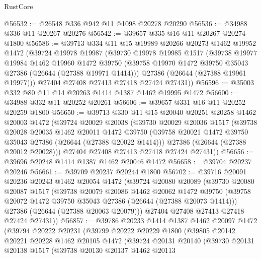 \begin{lexlean}{RustCore}
\begin{coremodule}
@56532 := @26548 @336 @942 @11 @1098 @20278 @20290
@56536 := @34988 @336 @11 @20267 @20276
@56542 := @39657 @335 @16 @11 @20267 @20274 @1800
@56586 := @39713
    @334
    @11
    @15
    @19989
    @20266
    @20273
    @1462
    @19952
    @1472
    (@39724
      @19978
      @19987
      (@39730
        @19978
        @19985
        @1517
        (@39738
          @19977
          @19984
          @1462
          @19960
          @1472
          @39750
          (@39758 @19970 @1472 @39750 @35043 @27386 (@26644 (@27388 @19971 @1414)))
          @27386
          (@26644 (@27388 @19961 @19977)))
        @27404
        @27408
        @27413
        @27418
        @27424
        @27431))
@56596 := @35003 @332 @80 @11 @14 @20263 @1414 @1387 @1462 @19995 @1472
@56600 := @34988 @332 @11 @20252 @20261
@56606 := @39657 @331 @16 @11 @20252 @20259 @1800
@56650 := @39713
    @330
    @11
    @15
    @20040
    @20251
    @20258
    @1462
    @20003
    @1472
    (@39724
      @20029
      @20038
      (@39730
        @20029
        @20036
        @1517
        (@39738
          @20028
          @20035
          @1462
          @20011
          @1472
          @39750
          (@39758 @20021 @1472 @39750 @35043 @27386 (@26644 (@27388 @20022 @1414)))
          @27386
          (@26644 (@27388 @20012 @20028)))
        @27404
        @27408
        @27413
        @27418
        @27424
        @27431))
@56656 := @39696 @20248 @1414 @1387 @1462 @20046 @1472
@56658 := @39704 @20237 @20246
@56661 := @39709 @20237 @20244 @1800
@56702 := @39716
    @20091
    @20236
    @20243
    @1462
    @20054
    @1472
    (@39724
      @20080
      @20089
      (@39730
        @20080
        @20087
        @1517
        (@39738
          @20079
          @20086
          @1462
          @20062
          @1472
          @39750
          (@39758 @20072 @1472 @39750 @35043 @27386 (@26644 (@27388 @20073 @1414)))
          @27386
          (@26644 (@27388 @20063 @20079)))
        @27404
        @27408
        @27413
        @27418
        @27424
        @27431))
@56857 := @39786
    @20233
    @1414
    @1387
    @1462
    @20097
    @1472
    (@39794
      @20222
      @20231
      (@39799
        @20222
        @20229
        @1800
        (@39805
          @20142
          @20221
          @20228
          @1462
          @20105
          @1472
          (@39724
            @20131
            @20140
            (@39730
              @20131
              @20138
              @1517
              (@39738
                @20130
                @20137
                @1462
                @20113

\end{coremodule}
\end{lexlean}
